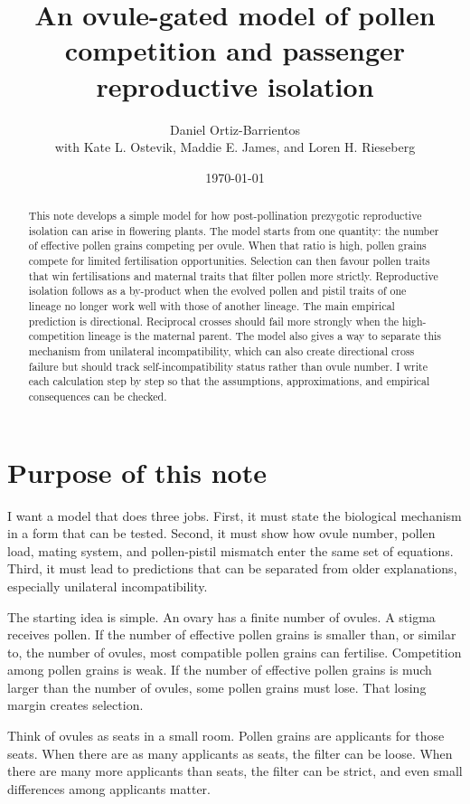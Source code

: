\documentclass[12pt]{article}
\title{An ovule-gated model of pollen competition and passenger reproductive isolation}
\author{Daniel Ortiz-Barrientos\\[3pt]{\normalsize with Kate L. Ostevik, Maddie E. James, and Loren H. Rieseberg}}
\date{\today}
\begin{document}
\maketitle

\begin{abstract}
This note develops a simple model for how post-pollination prezygotic reproductive isolation can arise in flowering plants. The model starts from one quantity: the number of effective pollen grains competing per ovule. When that ratio is high, pollen grains compete for limited fertilisation opportunities. Selection can then favour pollen traits that win fertilisations and maternal traits that filter pollen more strictly. Reproductive isolation follows as a by-product when the evolved pollen and pistil traits of one lineage no longer work well with those of another lineage. The main empirical prediction is directional. Reciprocal crosses should fail more strongly when the high-competition lineage is the maternal parent. The model also gives a way to separate this mechanism from unilateral incompatibility, which can also create directional cross failure but should track self-incompatibility status rather than ovule number. I write each calculation step by step so that the assumptions, approximations, and empirical consequences can be checked.
\end{abstract}

\tableofcontents
\newpage

\section{Purpose of this note}

I want a model that does three jobs. First, it must state the biological mechanism in a form that can be tested. Second, it must show how ovule number, pollen load, mating system, and pollen-pistil mismatch enter the same set of equations. Third, it must lead to predictions that can be separated from older explanations, especially unilateral incompatibility.

The starting idea is simple. An ovary has a finite number of ovules. A stigma receives pollen. If the number of effective pollen grains is smaller than, or similar to, the number of ovules, most compatible pollen grains can fertilise. Competition among pollen grains is weak. If the number of effective pollen grains is much larger than the number of ovules, some pollen grains must lose. That losing margin creates selection.

\begin{metaphorbox}
Think of ovules as seats in a small room. Pollen grains are applicants for those seats. When there are as many applicants as seats, the filter can be loose. When there are many more applicants than seats, the filter can be strict, and even small differences among applicants matter.
\end{metaphorbox}
\end{document}
